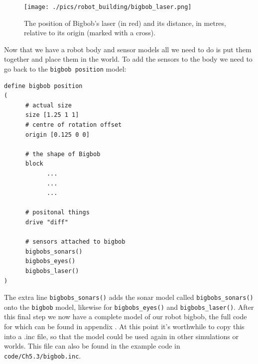 \documentclass[a4paper]{report}
\begin{document}
\begin{figure}
	\centering
	\texttt{[image: ./pics/robot\_building/bigbob\_laser.png]} 
	\caption{The position of Bigbob's laser (in red) and its distance, in metres, relative to its origin (marked with a cross).}
	\label{fig:BuildingAWorld:BuildingRobot:RobotSensors:Laser}
\end{figure}


Now that we have a robot body and sensor models all we need to do is put them together and place them in the world. To add the sensors to the body we need to go back to the \verb|bigbob position| model:
\begin{verbatim}
define bigbob position
(
      # actual size
      size [1.25 1 1]
      # centre of rotation offset
      origin [0.125 0 0]

      # the shape of Bigbob
      block
            ...
            ...
            ...
      
      # positonal things
      drive "diff"
      
      # sensors attached to bigbob
      bigbobs_sonars()
      bigbobs_eyes()
      bigbobs_laser()
)
\end{verbatim}
The extra line \verb|bigbobs_sonars()| adds the sonar model called
\verb|bigbobs_sonars()| onto the \verb|bigbob| model, likewise for
\verb|bigbobs_eyes()| and \verb|bigbobs_laser()|. After this final step we
now have a complete model of our robot bigbob, the full code for which can
be found in appendix \label{app:Abigbob.inc}.
At this point it's worthwhile to copy this into a .inc file, so that the
model could be used again in other simulations or worlds.  This file can
also be found in the example code in {\tt code/Ch5.3/bigbob.inc}.
\end{document}
